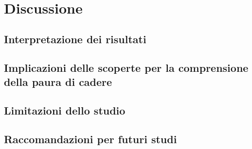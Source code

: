 \chapter{Discussione}
    \section{Interpretazione dei risultati}
    \section{Implicazioni delle scoperte per la comprensione della paura di cadere}
    \section{Limitazioni dello studio}
    \section{Raccomandazioni per futuri studi}